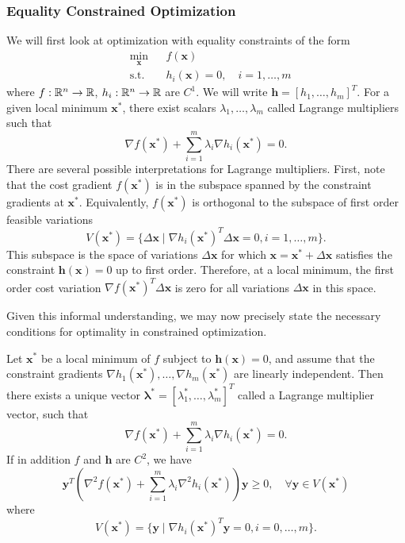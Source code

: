 \subsubsection{Equality Constrained Optimization}

We will first look at optimization with equality constraints of the form 
\begin{equation*}
\begin{aligned}
& \underset{\bm{x}}{\min}
& & f(\bm{x})\\
& \textrm{s.t.} & & h_i(\bm{x}) = 0, \quad i = 1, \ldots, m
\end{aligned}
\end{equation*}
where $f:\mathbb{R}^n \to \mathbb{R}$, $h_i:\mathbb{R}^n \to \mathbb{R}$ are $C^1$. We will write $\bm{h} = [h_1,\ldots, h_m ]^T$. For a given local minimum $\bm{x}^*$, there exist scalars $\lambda_1, \ldots, \lambda_m$ called Lagrange multipliers such that 
\begin{equation}
    \nabla f(\bm{x}^*) + \sum^m_{i=1} \lambda_i \nabla h_i(\bm{x}^*) = 0.
\end{equation}
There are several possible interpretations for Lagrange multipliers. First, note that the cost gradient $f(\bm{x}^*)$ is in the subspace spanned by the constraint gradients at $\bm{x}^*$. Equivalently, $f(\bm{x}^*)$ is orthogonal to the subspace of first order feasible variations 
\begin{equation}
    V(\bm{x}^*) = \{\Delta \bm{x} \mid \nabla h_i(\bm{x}^*)^T \Delta \bm{x} = 0, i=1,\ldots,m\}.
\end{equation}
This subspace is the space of variations $\Delta \bm{x}$ for which $\bm{x} = \bm{x}^* + \Delta \bm{x}$ satisfies the constraint $\bm{h}(\bm{x}) = 0$ up to first order. Therefore, at a local minimum, the first order cost variation $\nabla f(\bm{x}^*)^T \Delta \bm{x}$ is zero for all variations $\Delta \bm{x}$ in this space. 

Given this informal understanding, we may now precisely state the necessary conditions for optimality in constrained optimization. 

\begin{theorem}
\label{thm:eq_con_NOC}
Let $\bm{x}^*$ be a local minimum of $f$ subject to $\bm{h}(\bm{x}) = 0$, and assume that the constraint gradients $\nabla h_1(\bm{x}^*),\ldots,\nabla h_m(\bm{x}^*)$ are linearly independent. Then there exists a unique vector $\bm{\lambda}^* = [\lambda_1^*,\ldots,\lambda_m^*]^T$ called a Lagrange multiplier vector, such that
\begin{equation}
    \nabla f(\bm{x}^*) + \sum^m_{i=1} \lambda_i \nabla h_i(\bm{x}^*) = 0.
\end{equation}
If in addition $f$ and $\bm{h}$ are $C^2$, we have 
\begin{equation}
    \bm{y}^T (\nabla^2 f(\bm{x}^*) + \sum^m_{i=1} \lambda_i \nabla^2 h_i(\bm{x}^*)) \bm{y} \geq 0, \quad \forall \bm{y} \in V(\bm{x}^*) 
\end{equation}
where
\begin{equation}
    V(\bm{x}^*) = \{\bm{y} \mid \nabla h_i(\bm{x}^*)^T \bm{y} = 0, i=0,\ldots,m\}.
\end{equation}
\end{theorem}

